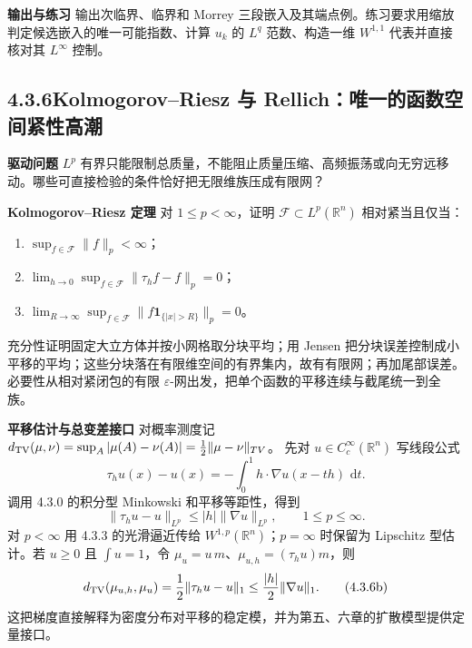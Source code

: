 \documentclass[11pt,a4paper]{ctexart}
\newcommand{\R}{\mathbb R}
\newcommand{\eps}{\varepsilon}
\newcommand{\dd}{\,\mathrm d}
\newcommand{\planitem}[1]{\par\smallskip\noindent\textcolor{deepblue}{\textbf{#1}}\quad}
\newcommand{\unithead}[2]{\subsection{#1\quad #2}}
\begin{document}
\planitem{输出与练习}
输出次临界、临界和 Morrey 三段嵌入及其端点例。练习要求用缩放判定候选嵌入的唯一可能指数、计算 $u_k$ 的 $L^q$ 范数、构造一维 $W^{1,1}$ 代表并直接核对其 $L^\infty$ 控制。

\unithead{4.3.6}{Kolmogorov--Riesz 与 Rellich：唯一的函数空间紧性高潮}

\planitem{驱动问题}
$L^p$ 有界只能限制总质量，不能阻止质量压缩、高频振荡或向无穷远移动。哪些可直接检验的条件恰好把无限维族压成有限网？

\planitem{Kolmogorov--Riesz 定理}
对 $1\le p<\infty$，证明 $\mathcal F\subset L^p(\R^n)$ 相对紧当且仅当：
\begin{enumerate}
\item $\sup_{f\in\mathcal F}\|f\|_p<\infty$；
\item $\lim_{h\to0}\sup_{f\in\mathcal F}\|\tau_hf-f\|_p=0$；
\item $\lim_{R\to\infty}\sup_{f\in\mathcal F}
\|f\mathbf1_{\{|x|>R\}}\|_p=0$。
\end{enumerate}
充分性证明固定大立方体并按小网格取分块平均；用 Jensen 把分块误差控制成小平移的平均；这些分块落在有限维空间的有界集内，故有有限网；再加尾部误差。必要性从相对紧闭包的有限 $\eps$-网出发，把单个函数的平移连续与截尾统一到全族。

\planitem{平移估计与总变差接口}
对概率测度记
$d_{\rm TV}(\mu,\nu)=\sup_A|\mu(A)-\nu(A)|=\tfrac12\|\mu-\nu\|_{TV}$。
先对 $u\in C_c^\infty(\R^n)$ 写线段公式
\[
 \tau_hu(x)-u(x)=-\int_0^1h\cdot\nabla u(x-th)\,\dd t.
\]
调用 4.3.0 的积分型 Minkowski 和平移等距性，得到
\[
 \|\tau_hu-u\|_{L^p}\le |h|\|\nabla u\|_{L^p},
 \qquad 1\le p\le\infty. \tag{4.3.6a}
\]
对 $p<\infty$ 用 4.3.3 的光滑逼近传给 $W^{1,p}(\R^n)$；$p=\infty$ 时保留为
Lipschitz 型估计。若 $u\ge0$ 且 $\int u=1$，令
$\mu_u=u\,m$、$\mu_{u,h}=(\tau_hu)m$，则
\[
 d_{\rm TV}(\mu_{u,h},\mu_u)=\frac12\|\tau_hu-u\|_1
 \le\frac{|h|}{2}\|\nabla u\|_1. \tag{4.3.6b}
\]
这把梯度直接解释为密度分布对平移的稳定模，并为第五、六章的扩散模型提供定量接口。
\end{document}
